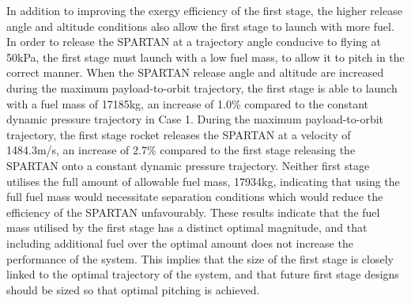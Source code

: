 In addition to improving the exergy efficiency of the first stage, the higher release angle and altitude conditions also allow the first stage to launch with more fuel. In order to release the SPARTAN at a trajectory angle conducive to flying at 50kPa, the first stage must launch with a low fuel mass, to allow it to pitch in the correct manner. When the SPARTAN release angle and altitude are increased during the maximum payload-to-orbit trajectory, the first stage is able to launch with a fuel mass of 17185kg, an increase of 1.0\% compared to the constant dynamic pressure trajectory in Case 1. During the maximum payload-to-orbit trajectory, the first stage rocket releases the SPARTAN at a velocity of 1484.3m/s, an increase of 2.7\% compared to the first stage releasing the SPARTAN onto a constant dynamic pressure trajectory. Neither first stage utilises the full amount of allowable fuel mass, 17934kg, indicating that using the full fuel mass would necessitate separation conditions which would reduce the efficiency of the SPARTAN unfavourably. 
These results indicate that the fuel mass utilised by the first stage has a distinct optimal magnitude, and that including additional fuel over the optimal amount does not increase the performance of the system. This implies that the size of the first stage is closely linked to the optimal trajectory of the system, and that future first stage designs should be sized so that optimal pitching is achieved. 


